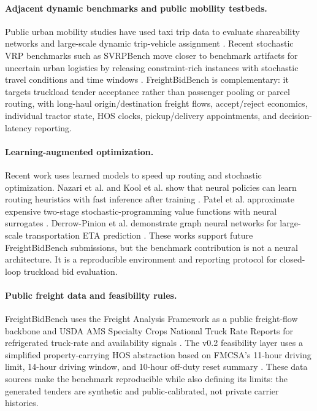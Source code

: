 \documentclass[11pt]{article}
\begin{document}
\paragraph{Adjacent dynamic benchmarks and public mobility testbeds.}
Public urban mobility studies have used taxi trip data to evaluate
shareability networks and large-scale dynamic trip-vehicle assignment
\citep{santi2014shareability,alonsomora2017ondemand}. Recent stochastic VRP
benchmarks such as SVRPBench move closer to benchmark artifacts for uncertain
urban logistics by releasing constraint-rich instances with stochastic travel
conditions and time windows \citep{heakl2025svrpbench}. FreightBidBench is
complementary: it targets truckload tender acceptance rather than passenger
pooling or parcel routing, with long-haul origin/destination freight flows,
accept/reject economics, individual tractor state, HOS clocks, pickup/delivery
appointments, and decision-latency reporting.

\paragraph{Learning-augmented optimization.}
Recent work uses learned models to speed up routing and stochastic
optimization. Nazari et al. and Kool et al. show that neural policies can
learn routing heuristics with fast inference after training
\citep{nazari2018rlvrp,kool2019attention}. Patel et al. approximate expensive
two-stage stochastic-programming value functions with neural surrogates
\citep{patel2022neur2sp}. Derrow-Pinion et al. demonstrate graph neural
networks for large-scale transportation ETA prediction
\citep{derrowpinion2021eta}. These works support future FreightBidBench
submissions, but the benchmark contribution is not a neural architecture. It is
a reproducible environment and reporting protocol for closed-loop truckload bid
evaluation.

\paragraph{Public freight data and feasibility rules.}
FreightBidBench uses the Freight Analysis Framework as a public freight-flow
backbone \citep{btsfaf5} and USDA AMS Specialty Crops National Truck Rate
Reports for refrigerated truck-rate and availability signals
\citep{usdafvwtrk}. The v0.2 feasibility layer uses a simplified
property-carrying HOS abstraction based on FMCSA's 11-hour driving limit,
14-hour driving window, and 10-hour off-duty reset summary \citep{fmcsa_hos}.
These data sources make the benchmark reproducible while also defining its
limits: the generated tenders are synthetic and public-calibrated, not private
carrier histories.
\end{document}
